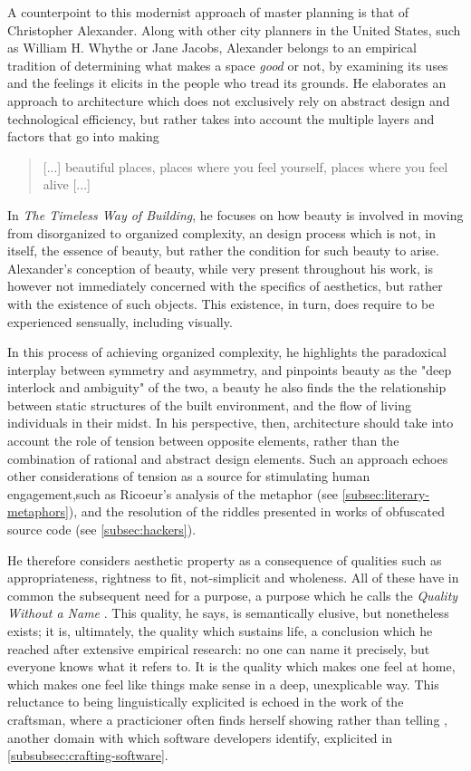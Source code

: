 A counterpoint to this modernist approach of master planning is that of Christopher Alexander. Along with other city planners in the United States, such as William H. Whythe or Jane Jacobs, Alexander belongs to an empirical tradition of determining what makes a space \emph{good} or not, by examining its uses and the feelings it elicits in the people who tread its grounds. He elaborates an approach to architecture which does not exclusively rely on abstract design and technological efficiency, but rather takes into account the multiple layers and factors that go into making

\begin{quote}
    [...] beautiful places, places where you feel yourself, places where you feel alive \citep{alexander_timeless_1979} [...]
\end{quote}

In \emph{The Timeless Way of Building}, he focuses on how beauty is involved in moving from disorganized to organized complexity, an design process which is not, in itself, the essence of beauty, but rather the condition for such beauty to arise. Alexander's conception of beauty, while very present throughout his work, is however not immediately concerned with the specifics of aesthetics, but rather with the existence of such objects. This existence, in turn, does require to be experienced sensually, including visually.

In this process of achieving organized complexity, he highlights the paradoxical interplay between symmetry and asymmetry, and pinpoints beauty as the "deep interlock and ambiguity" of the two, a beauty he also finds the the relationship between static structures of the built environment, and the flow of living individuals in their midst. In his perspective, then, architecture should take into account the role of tension between opposite elements, rather than the combination of rational and abstract design elements. Such an approach echoes other considerations of tension as a source for stimulating human engagement,such as Ricoeur's analysis of the metaphor (see \ref{subsec:literary-metaphors}), and the resolution of the riddles presented in works of obfuscated source code (see \ref{subsec:hackers}).

He therefore considers aesthetic property as a consequence of qualities such as appropriateness, rightness to fit, not-simplicit and wholeness. All of these have in common the subsequent need for a purpose, a purpose which he calls the \emph{Quality Without a Name} \citep{alexander_timeless_1979}. This quality, he says, is semantically elusive, but nonetheless exists; it is, ultimately, the quality which sustains life, a conclusion which he reached after extensive empirical research: no one can name it precisely, but everyone knows what it refers to. It is the quality which makes one feel at home, which makes one feel like things make sense in a deep, unexplicable way. This reluctance to being linguistically explicited is echoed in the work of the craftsman, where a practicioner often finds herself showing rather than telling \citep{pye_nature_2008}, another domain with which software developers identify, explicited in \ref{subsubsec:crafting-software}.


